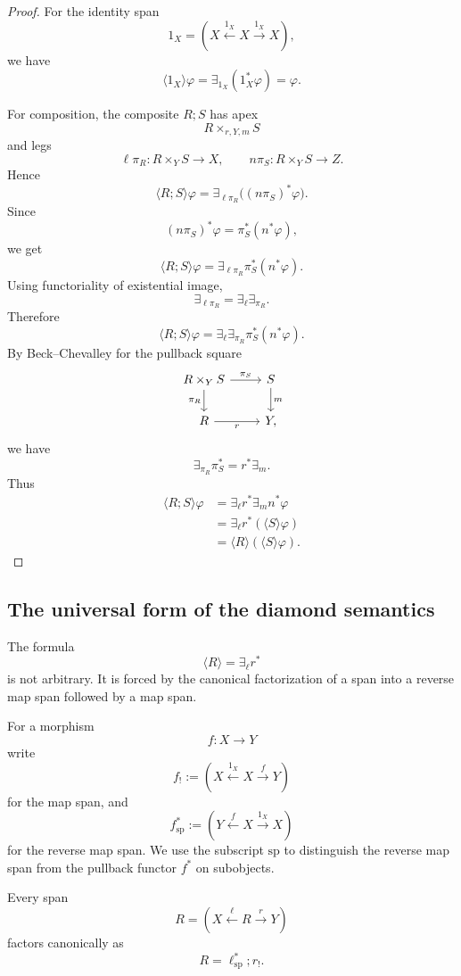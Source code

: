\begin{proof}
For the identity span
\[
1_X=
\left(
X\xleftarrow{1_X}X\xrightarrow{1_X}X
\right),
\]
we have
\[
\langle 1_X\rangle\varphi
=
\exists_{1_X}(1_X^\ast\varphi)
=
\varphi.
\]

For composition, the composite \(R;S\) has apex
\[
R\times_{r,Y,m}S
\]
and legs
\[
\ell\pi_R:R\times_Y S\to X,
\qquad
n\pi_S:R\times_Y S\to Z.
\]
Hence
\[
\langle R;S\rangle\varphi
=
\exists_{\ell\pi_R}\bigl((n\pi_S)^\ast\varphi\bigr).
\]
Since
\[
(n\pi_S)^\ast\varphi
=
\pi_S^\ast(n^\ast\varphi),
\]
we get
\[
\langle R;S\rangle\varphi
=
\exists_{\ell\pi_R}\pi_S^\ast(n^\ast\varphi).
\]
Using functoriality of existential image,
\[
\exists_{\ell\pi_R}
=
\exists_\ell\exists_{\pi_R}.
\]
Therefore
\[
\langle R;S\rangle\varphi
=
\exists_\ell\exists_{\pi_R}\pi_S^\ast(n^\ast\varphi).
\]
By Beck--Chevalley for the pullback square
\[
\begin{tikzcd}
R\times_Y S \arrow[r, "\pi_S"] \arrow[d, "\pi_R"']
&
S \arrow[d, "m"]
\\
R \arrow[r, "r"'] & Y,
\end{tikzcd}
\]
we have
\[
\exists_{\pi_R}\pi_S^\ast
=
r^\ast\exists_m.
\]
Thus
\[
\begin{aligned}
\langle R;S\rangle\varphi
&=
\exists_\ell r^\ast\exists_m n^\ast\varphi
\\
&=
\exists_\ell r^\ast(\langle S\rangle\varphi)
\\
&=
\langle R\rangle(\langle S\rangle\varphi).
\end{aligned}
\]
\end{proof}

\subsection{The universal form of the diamond semantics}

The formula
\[
\langle R\rangle=\exists_\ell r^\ast
\]
is not arbitrary. It is forced by the canonical factorization of a span into a reverse map span followed by a map span.

For a morphism
\[
f:X\to Y
\]
write
\[
f_!
:=
\left(
X\xleftarrow{1_X}X\xrightarrow{f}Y
\right)
\]
for the map span, and
\[
f^\ast_{\mathrm{sp}}
:=
\left(
Y\xleftarrow{f}X\xrightarrow{1_X}X
\right)
\]
for the reverse map span. We use the subscript \({\mathrm{sp}}\) to distinguish the reverse map span from the pullback functor \(f^\ast\) on subobjects.

Every span
\[
R=
\left(
X\xleftarrow{\ell}R\xrightarrow{r}Y
\right)
\]
factors canonically as
\[
R
=
\ell^\ast_{\mathrm{sp}};r_!.
\]

